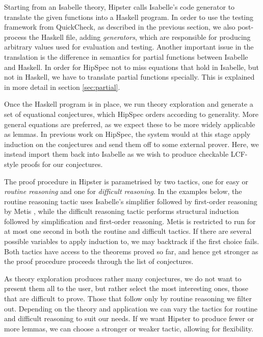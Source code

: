 Starting from an Isabelle theory, Hipster calls Isabelle's code generator \cite{codegen} to translate the given functions into a Haskell program. In order to use the testing framework from QuickCheck, as described in the previous section, we also post-process the Haskell file, adding \emph{generators}, which are responsible for producing arbitrary values used for evaluation and testing.
Another important issue in the translation is the difference in
semantics for partial functions between Isabelle and Haskell. In order
for HipSpec not to miss equations that hold in Isabelle, but not in
Haskell, we have to translate partial functions specially.
This is explained in more detail in section \ref{sec:partial}.

Once the Haskell program is in place, we run theory exploration and generate a set of equational conjectures, which HipSpec orders according to generality. More general equations are preferred, as we expect these to be more widely applicable as lemmas. In previous work on HipSpec, the system would at this stage apply induction on the conjectures and send them off to some external prover. Here, we instead import them back into Isabelle as we wish to produce checkable LCF-style proofs for our conjectures. 

The proof procedure in Hipster is parametrised by two tactics, one for
easy or \emph{routine reasoning} and one for \emph{difficult
  reasoning}. In the examples below, the routine reasoning tactic uses
Isabelle's simplifier followed by first-order reasoning by Metis
\cite{metis}, while the difficult reasoning tactic performs structural induction followed by simplification and first-order reasoning. Metis is restricted to run for at most one second in both the routine and difficult tactics. If there are several possible variables to apply induction to, we may backtrack if the first choice fails. Both tactics have access to the theorems proved so far, and hence get stronger as the proof procedure proceeds through the list of conjectures.

As theory exploration produces rather many conjectures, we do not want
to present them all to the user, but rather select the most
interesting ones, those that are difficult to prove. Those that follow only by routine reasoning we filter out.
Depending on the theory and application we can vary the tactics for routine and difficult reasoning to suit our needs. If we want Hipster to produce fewer or more lemmas, we can choose a stronger or weaker tactic, allowing for flexibility.

